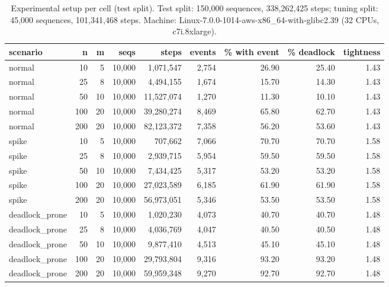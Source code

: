 \begin{table}[t]
\centering
\footnotesize
\caption{Experimental setup per cell (test split). Test split: 150,000 sequences, 338,262,425 steps; tuning split: 45,000 sequences, 101,341,468 steps. Machine: Linux-7.0.0-1014-aws-x86\_64-with-glibc2.39 (32 CPUs, c7i.8xlarge).}
\label{tab:setup}
\begin{tabular}{lrrrrrrrr}
\toprule
scenario & n & m & seqs & steps & events & \% with event & \% deadlock & tightness \\
\midrule
normal & 10 & 5 & 10{,}000 & 1{,}071{,}547 & 2{,}754 & 26.90 & 25.40 & 1.43 \\
normal & 25 & 8 & 10{,}000 & 4{,}494{,}155 & 1{,}674 & 15.70 & 14.30 & 1.43 \\
normal & 50 & 10 & 10{,}000 & 11{,}527{,}074 & 1{,}270 & 11.30 & 10.10 & 1.43 \\
normal & 100 & 20 & 10{,}000 & 39{,}280{,}274 & 8{,}469 & 65.80 & 62.70 & 1.43 \\
normal & 200 & 20 & 10{,}000 & 82{,}123{,}372 & 7{,}358 & 56.20 & 53.60 & 1.43 \\
spike & 10 & 5 & 10{,}000 & 707{,}662 & 7{,}066 & 70.70 & 70.70 & 1.58 \\
spike & 25 & 8 & 10{,}000 & 2{,}939{,}715 & 5{,}954 & 59.50 & 59.50 & 1.58 \\
spike & 50 & 10 & 10{,}000 & 7{,}434{,}425 & 5{,}317 & 53.20 & 53.20 & 1.58 \\
spike & 100 & 20 & 10{,}000 & 27{,}023{,}589 & 6{,}185 & 61.90 & 61.90 & 1.58 \\
spike & 200 & 20 & 10{,}000 & 56{,}973{,}051 & 5{,}346 & 53.50 & 53.50 & 1.58 \\
deadlock\_prone & 10 & 5 & 10{,}000 & 1{,}020{,}230 & 4{,}073 & 40.70 & 40.70 & 1.48 \\
deadlock\_prone & 25 & 8 & 10{,}000 & 4{,}036{,}769 & 4{,}047 & 40.50 & 40.50 & 1.48 \\
deadlock\_prone & 50 & 10 & 10{,}000 & 9{,}877{,}410 & 4{,}513 & 45.10 & 45.10 & 1.48 \\
deadlock\_prone & 100 & 20 & 10{,}000 & 29{,}793{,}804 & 9{,}316 & 93.20 & 93.20 & 1.48 \\
deadlock\_prone & 200 & 20 & 10{,}000 & 59{,}959{,}348 & 9{,}270 & 92.70 & 92.70 & 1.48 \\
\bottomrule
\end{tabular}
\end{table}
